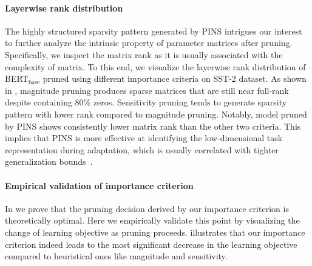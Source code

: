 \paragraph{Layerwise rank distribution} 
The highly structured sparsity pattern generated by  PINS intrigues our interest to further analyze the intrinsic property of parameter matrices after pruning. Specifically, we inspect the matrix rank as it is usually associated with the complexity of matrix. To this end, we visualize the layerwise rank distribution of  BERT$_{\text{base}}$ pruned using different importance criteria on SST-2 dataset. As shown in , magnitude pruning produces sparse matrices that are still near full-rank despite containing 80\% zeros. Sensitivity pruning tends to generate sparsity pattern with lower rank compared to magnitude pruning. Notably, model pruned by PINS shows consistently lower matrix rank than the other two criteria. This implies that PINS is more effective at identifying the low-dimensional task representation during adaptation, which is usually correlated with tighter generalization bounds~\cite{compressionbounds,intrinsicdimension}.

\paragraph{Empirical validation of importance criterion}
In  we prove that the pruning decision derived by our importance criterion is theoretically optimal. Here we empirically validate this point by visualizing the change of learning objective as pruning proceeds.  illustrates that our importance criterion indeed leads to the most significant decrease in the learning objective compared to heuristical ones like magnitude and sensitivity.



